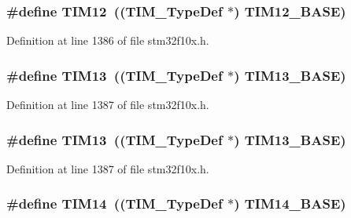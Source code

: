 \subsubsection[{\texorpdfstring{T\+I\+M12}{TIM12}}]{\setlength{\rightskip}{0pt plus 5cm}\#define T\+I\+M12~(({\bf T\+I\+M\+\_\+\+Type\+Def} $\ast$) {\bf T\+I\+M12\+\_\+\+B\+A\+SE})}\hypertarget{group___peripheral__declaration_ga2397f8a0f8e7aa10cf8e8c049e431e53}{}\label{group___peripheral__declaration_ga2397f8a0f8e7aa10cf8e8c049e431e53}


Definition at line 1386 of file stm32f10x.\+h.

\subsubsection[{\texorpdfstring{T\+I\+M13}{TIM13}}]{\setlength{\rightskip}{0pt plus 5cm}\#define T\+I\+M13~(({\bf T\+I\+M\+\_\+\+Type\+Def} $\ast$) {\bf T\+I\+M13\+\_\+\+B\+A\+SE})}\hypertarget{group___peripheral__declaration_ga5a959a833074d59bf6cc7fb437c65b18}{}\label{group___peripheral__declaration_ga5a959a833074d59bf6cc7fb437c65b18}


Definition at line 1387 of file stm32f10x.\+h.

\subsubsection[{\texorpdfstring{T\+I\+M13}{TIM13}}]{\setlength{\rightskip}{0pt plus 5cm}\#define T\+I\+M13~(({\bf T\+I\+M\+\_\+\+Type\+Def} $\ast$) {\bf T\+I\+M13\+\_\+\+B\+A\+SE})}\hypertarget{group___peripheral__declaration_ga5a959a833074d59bf6cc7fb437c65b18}{}\label{group___peripheral__declaration_ga5a959a833074d59bf6cc7fb437c65b18}


Definition at line 1387 of file stm32f10x.\+h.

\subsubsection[{\texorpdfstring{T\+I\+M14}{TIM14}}]{\setlength{\rightskip}{0pt plus 5cm}\#define T\+I\+M14~(({\bf T\+I\+M\+\_\+\+Type\+Def} $\ast$) {\bf T\+I\+M14\+\_\+\+B\+A\+SE})}\hypertarget{group___peripheral__declaration_ga2dd30f46fad69dd73e1d8941a43daffe}{}\label{group___peripheral__declaration_ga2dd30f46fad69dd73e1d8941a43daffe}


